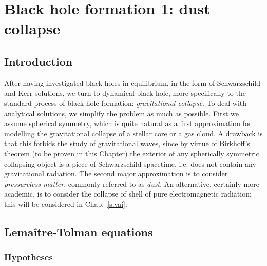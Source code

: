 \chapter{Black hole formation 1: dust collapse}
\label{s:lem}

\minitoc

\section{Introduction}

After having investigated black holes in equilibrium, in the form of
Schwarzschild and Kerr solutions, we turn to dynamical black hole,
more specifically to the standard process of
black hole formation: \emph{gravitational collapse}.
To deal with analytical solutions, we simplify the problem as much as
possible. First we assume spherical symmetry, which is quite natural
as a first approximation for modelling the gravitational collapse
of a stellar core or a gas cloud. A drawback is that this forbids the
study of gravitational waves, since by
virtue of Birkhoff's theorem (to be proven in this Chapter)
the exterior
of any spherically symmetric collapsing object is a piece of Schwarzschild
spacetime, i.e. does not contain any gravitational radiation.
The second major approximation is to consider \emph{pressureless matter},
commonly referred to as \emph{dust}.
An alternative, certainly more academic, is to consider the collapse of shell of pure electromagnetic radiation; this will be considered in Chap.~\ref{s:vai}.

\section{Lemaître-Tolman equations}

\subsection{Hypotheses} \label{s:lem:hyp}

